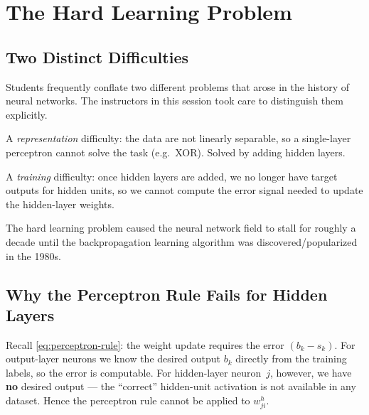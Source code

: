 \documentclass[12pt,a4paper]{article}
\newcommand{\wji}{w_{ji}^{h}}
\begin{document}
\section{The Hard Learning Problem}
\label{sec:hard-learning}

\subsection{Two Distinct Difficulties}

Students frequently conflate two different problems that arose in the history of
neural networks.  The instructors in this session took care to distinguish them
explicitly.

\begin{keyinsight}[title=Hard Problem vs.\ Hard Learning Problem]
\begin{description}[labelwidth=4.5cm,leftmargin=!]
  \item[Hard problem] A \emph{representation} difficulty: the data are not
        linearly separable, so a single-layer perceptron cannot solve the task
        (e.g.\ XOR).  Solved by adding hidden layers.
  \item[Hard learning problem] A \emph{training} difficulty: once hidden layers
        are added, we no longer have target outputs for hidden units, so we
        cannot compute the error signal needed to update the hidden-layer
        weights.
\end{description}
\end{keyinsight}

The hard learning problem caused the neural network field to stall for
roughly a decade until the backpropagation learning algorithm was
discovered/popularized in the 1980s.

\subsection{Why the Perceptron Rule Fails for Hidden Layers}

Recall \cref{eq:perceptron-rule}: the weight update requires the error
$(b_k - s_k)$.  For output-layer neurons we know the desired output $b_k$
directly from the training labels, so the error is computable.  For
hidden-layer neuron~$j$, however, we have \textbf{no} desired output --- the
``correct'' hidden-unit activation is not available in any dataset.  Hence
the perceptron rule cannot be applied to $\wji$.
\end{document}
